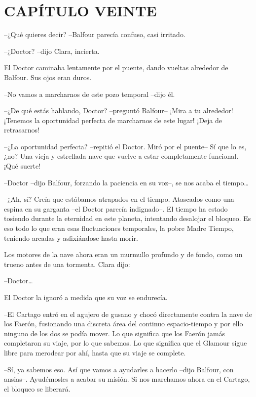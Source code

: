 \chapter*{CAPÍTULO VEINTE}

{--¿Qué quieres decir? --Balfour parecía confuso, casi irritado.}

{--¿Doctor? --dijo Clara, incierta.}

{El Doctor caminaba lentamente por el puente, dando vueltas alrededor de
Balfour. Sus ojos eran duros.}

{--No vamos a marcharnos de este pozo temporal --dijo él.}

{--¿De qué estás hablando, Doctor? --preguntó Balfour-- ¡Mira a tu
 alrededor! ¡Tenemos la oportunidad perfecta de marcharnos de este lugar!
¡Deja de retrasarnos!}

{--¿La oportunidad perfecta? --repitió el Doctor. Miró por el puente-- Sí
 que lo es, ¿no? Una vieja y estrellada nave que vuelve a estar
completamente funcional. ¡Qué suerte!}

{--Doctor --dijo Balfour, forzando la paciencia en su voz--, se nos acaba
 el tiempo\ldots{}}

{--¿Ah, sí? Creía que estábamos atrapados en el tiempo. Atascados como
 una espina en su garganta --el Doctor parecía indignado--. El tiempo ha
 estado tosiendo durante la eternidad en este planeta, intentando
 desalojar el bloqueo. Es eso todo lo que eran esas fluctuaciones
 temporales, la pobre Madre Tiempo, teniendo arcadas y asfixiándose hasta
morir.}

{Los motores de la nave ahora eran un murmullo profundo y de fondo, como
un trueno antes de una tormenta. Clara dijo:}

{--Doctor\ldots{}}

{El Doctor la ignoró a medida que su voz se endurecía.}

{--El Cartago entró en el agujero de gusano y chocó directamente contra
 la nave de los Faerón, fusionando una discreta área del continuo
 espacio-tiempo y por ello ninguno de los dos se podía mover. Lo que
 significa que los Faerón jamás completaron su viaje, por lo que sabemos.
 Lo que significa que el Glamour sigue libre para merodear por ahí, hasta
que su viaje se complete.}

{--Sí, ya sabemos eso. Así que vamos a ayudarles a hacerlo --dijo
 Balfour, con ansias--. Ayudémosles a acabar su misión. Si nos marchamos
ahora en el Cartago, el bloqueo se liberará.}

